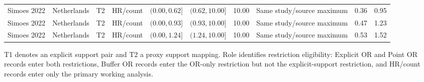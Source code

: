 \documentclass[11pt]{article}
\begin{document}
\begin{landscape}
\begin{table}[p]
{\begin{tabular}{llclllrlrr}
Simoes 2022 & Netherlands & T2 & HR/count & $(0.00,0.62]$ & $(0.62,10.00]$ & 10.00 & Same study/source maximum & 0.36 & 0.95 \\
Simoes 2022 & Netherlands & T2 & HR/count & $(0.00,0.93]$ & $(0.93,10.00]$ & 10.00 & Same study/source maximum & 0.47 & 1.23 \\
Simoes 2022 & Netherlands & T2 & HR/count & $(0.00,1.24]$ & $(1.24,10.00]$ & 10.00 & Same study/source maximum & 0.53 & 1.52 \\
\bottomrule
\end{tabular}}
\par\smallskip
{\footnotesize T1 denotes an explicit support pair and T2 a proxy support
mapping. Role identifies restriction eligibility: Explicit OR and Point OR
records enter both restrictions, Buffer OR records enter the OR-only
restriction but not the explicit-support restriction, and HR/count records
enter only the primary working analysis.}
\end{table}
\end{landscape}
\pdfpageattr{}

\clearpage
{\sloppy\printbibliography}
\end{document}
